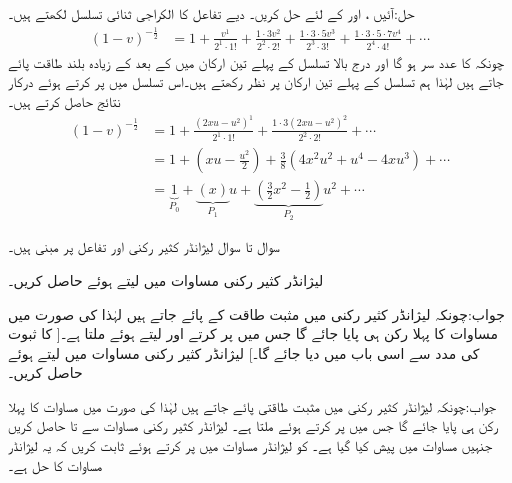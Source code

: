 حل:آئیں ،  اور  کے لئے حل کریں۔ دیے تفاعل کا الکراجی ثنائی تسلسل لکھتے ہیں۔
\begin{align*}
(1-v)^{-\frac{1}{2}}&=1+\frac{v^1}{2^1\cdot 1!}+\frac{1\cdot 3 v^2}{2^2\cdot 2!}+\frac{1\cdot 3 \cdot 5 v^3}{2^3\cdot 3!}+\frac{1\cdot 3 \cdot 5\cdot 7 v^4}{2^4\cdot 4!}+\cdots
\end{align*}
چونکہ  کا عدد سر  ہو گا اور درج بالا تسلسل کے پہلے تین ارکان میں کے بعد  کے زیادہ بلند طاقت پائے جاتے ہیں لہٰذا ہم تسلسل کے پہلے تین ارکان پر نظر رکھتے ہیں۔اس تسلسل میں  پر کرتے ہوئے درکار نتائج حاصل کرتے ہیں۔
\begin{align*}
(1-v)^{-\frac{1}{2}}&=1+\frac{(2xu-u^2)^1}{2^1\cdot 1!}+\frac{1\cdot 3 (2xu-u^2)^2}{2^2\cdot 2!}+\cdots\\
&=1+(xu-\frac{u^2}{2})+\frac{3}{8}(4x^2u^2+u^4-4xu^3)+\cdots\\
&=\underbrace{1}_{P_0}+\underbrace{\left(x\right)}_{P_1}u+\underbrace{\left(\frac{3}{2}x^2-\frac{1}{2}\right)}_{P_2}u^2+\cdots
\end{align*}

سوال  تا سوال  لیژانڈر کثیر رکنی اور تفاعل پر مبنی ہیں۔

لیژانڈر کثیر رکنی مساوات  میں  لیتے ہوئے  حاصل کریں۔

جواب:چونکہ لیژانڈر کثیر رکنی میں مثبت طاقت کے  پائے جاتے ہیں لہٰذا  کی صورت میں مساوات  کا پہلا رکن
  ہی پایا جائے گا جس میں  پر کرتے اور  لیتے ہوئے  ملتا ہے۔[ کا ثبوت  کی مدد سے اسی باب میں دیا جائے گا۔]
لیژانڈر کثیر رکنی مساوات  میں  لیتے ہوئے  حاصل کریں۔

جواب:چونکہ لیژانڈر کثیر رکنی میں مثبت طاقتی  پائے جاتے ہیں لہٰذا  کی صورت میں مساوات  کا پہلا رکن
  ہی پایا جائے گا جس میں  پر کرتے ہوئے  ملتا ہے۔
لیژانڈر کثیر رکنی مساوات  سے  تا  حاصل کریں جنہیں مساوات  میں پیش کیا گیا ہے۔
  کو لیژانڈر مساوات  میں پر کرتے ہوئے ثابت کریں کہ یہ لیژانڈر مساوات کا حل ہے۔

